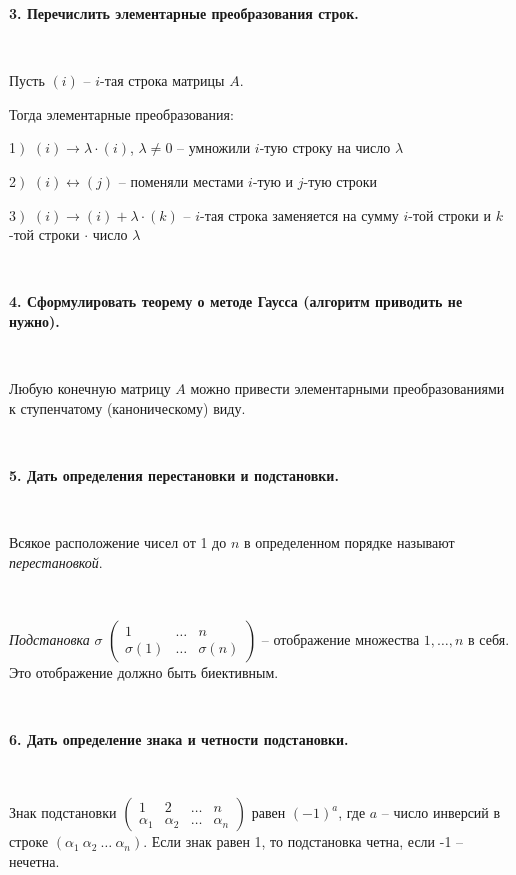 \documentclass{article}
\begin{document}
	\textbf{3. Перечислить элементарные преобразования строк.} 
	
	{
		$\;$
		\setlength{\parindent}{0.4cm}
		\hangindent=0.4cm
		
		Пусть $(i)$ -- $i$-тая строка матрицы $A$.
		
		Тогда элементарные преобразования:
		
		1$\left.\right)$ $(i)\rightarrow\lambda\cdot(i)$, $ \lambda\ne 0$ --
		умножили $i$-тую строку на число $\lambda$
		
		2$\left.\right)$ $(i)\leftrightarrow (j)$ -- поменяли местами $i$-тую и $j$-тую строки
		
		3$\left.\right)$ $(i)\rightarrow (i)+\lambda\cdot(k)$ -- $i$-тая строка заменяется на сумму $i$-той строки и $k$-той		
строки $\cdot$ число $\lambda$
		
		$\;$
		\setlength{\parindent}{0cm}
		\hangindent=0cm
	}

	\textbf{4. Сформулировать теорему о методе Гаусса (алгоритм приводить не нужно).}
	
	{
		$\;$
		\setlength{\parindent}{0.4cm}
		\hangindent=0.4cm
		
		Любую конечную матрицу $A$ можно привести элементарными преобразованиями к ступенчатому (каноническому) виду.
		
		$\;$
		\setlength{\parindent}{0cm}
		\hangindent=0cm
	}
	
	\textbf{5. Дать определения перестановки и подстановки.}
	
	{
		$\;$
		\setlength{\parindent}{0.4cm}
		\hangindent=0.4cm

		Всякое расположение чисел от 1 до $n$ в определенном порядке называют \textit{перестановкой}. 
		
		$\;$
		
		\textit{Подстановка} $\sigma$ {\scriptsize $\begin{pmatrix}
		1& \ldots& n\\
		\sigma(1)&\ldots&\sigma(n)
		\end{pmatrix}$} -- отображение множества $1, \ldots, n$ в себя. Это отображение должно быть биективным.
		
		$\;$
		\setlength{\parindent}{0cm}
		\hangindent=0cm
	}
	
	
	\textbf{6. Дать определение знака и четности подстановки.} 
	
	{
		$\;$
		\setlength{\parindent}{0.4cm}
		\hangindent=0.4cm
		
		Знак подстановки {\scriptsize $\begin{pmatrix}
		1&2&\ldots&n\\
		\alpha_1&\alpha_2&\ldots&\alpha_n
		\end{pmatrix}$} равен $(-1)^a$, где $a$ -- число инверсий в строке $(\alpha_1\ \alpha_2\ \ldots\ \alpha_n)$. 	Если знак равен 1, то подстановка четна, если -1 -- нечетна.
		
		$\;$
		\setlength{\parindent}{0cm}
		\hangindent=0cm
	}
	
\end{document}
